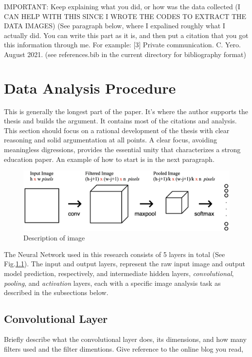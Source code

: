 \documentclass[conference]{IEEEtran}
\begin{document}
IMPORTANT: Keep explaining what you did, or how was the data collected (I CAN HELP WITH THIS SINCE I WROTE THE CODES TO EXTRACT THE DATA IMAGES)
(See paragraph below, where I expalined roughly what I actually did. You can write this part as it is, and then put a citation that you got this
information through me. For example:  [3] Private communication. C. Yero. August 2021. (see references.bib in the current directory for bibliography format)

\section{Data Analysis Procedure}

This is generally the longest part of the paper. It's where the author supports the thesis and builds the argument.
It contains most of the citations and analysis. This section should focus on a rational development of the thesis with clear
reasoning and solid argumentation at all points. A clear focus, avoiding meaningless digressions, provides the essential unity
that characterizes a strong education paper. An example of how to start is in the next paragraph. \\
\begin{figure}
  \centering
  \includegraphics[scale=0.3]{images/CNN_layers.png}
  \caption{Description of image}
\end{figure}
\indent The Neural Network used in this research consists of 5 layers in total (See Fig.\ref{}). The input and output layers,
represent the raw input image and output model prediction, respectively, and intermediate hidden layers,
\textit{convolutional}, \textit{pooling}, and \textit{activation} layers, each with a specific image analysis task
as described in the subsections below.\\
\subsection{Convolutional Layer}
Briefly describe what the convolutional layer does, its dimensions, and how many filters used and the filter dimentions. Give reference to the online blog you read, \cite{CNNPart1_VZ_2019}
\end{document}

